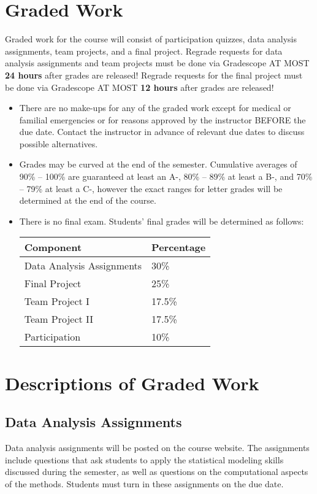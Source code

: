 \documentclass[11pt, a4paper]{article}
\begin{document}
\section{Graded Work} 
Graded work for the course will consist of participation quizzes, data analysis assignments, team projects, and a final project. Regrade requests for data analysis assignments and team projects must be done via Gradescope AT MOST \textbf{24 hours} after grades are released! Regrade requests for the final project must be done via Gradescope AT MOST \textbf{12 hours} after grades are released!
\begin{itemize}[label= {\color{darkblue}{\ArrowBoldRightStrobe}}]
	\item There are no make-ups for any of the graded work except for medical or familial emergencies or for reasons approved by the instructor BEFORE the due date. Contact the instructor in advance of relevant due dates to discuss possible alternatives. 
	
	\item Grades may be curved at the end of the semester. Cumulative averages of 90\% -- 100\% are guaranteed at least an A-, 80\% -- 89\% at least a B-, and 70\% -- 79\% at least a C-, however the exact ranges for letter grades will be determined at the end of the course.
	
	\item There is no final exam. Students' final grades will be determined as follows:
	\begin{table}[h]
		\centering
		\begin{tabular}{ll}
			Component & Percentage \\ \hline
			Data Analysis Assignments & 30\% \\
			Final Project & 25\% \\ 
			Team Project I & 17.5\% \\
			Team Project II & 17.5\% \\
			Participation & 10\% \\ \hline 
		\end{tabular}
	\end{table}
\end{itemize}


\section{Descriptions of Graded Work}
\subsection{Data Analysis Assignments}
Data analysis assignments will be posted on the course website. The assignments include questions that ask students to apply the statistical modeling skills discussed during the semester, as well as questions on the computational aspects of the methods. Students must turn in these assignments on the due date. 
\end{document}
